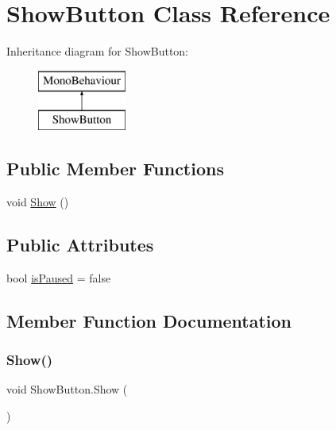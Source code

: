 \hypertarget{class_show_button}{}\section{Show\+Button Class Reference}
\label{class_show_button}
Inheritance diagram for Show\+Button\+:\begin{figure}[H]
\begin{center}
\leavevmode
\includegraphics[height=2.000000cm]{class_show_button}
\end{center}
\end{figure}
\subsection*{Public Member Functions}
\begin{DoxyCompactItemize}
\item 
void \mbox{\hyperlink{class_show_button_a8f2bd61ba16b46b401390a7357cf8249}{Show}} ()
\end{DoxyCompactItemize}
\subsection*{Public Attributes}
\begin{DoxyCompactItemize}
\item 
bool \mbox{\hyperlink{class_show_button_abda8b88daac10df3fe20c640360fcaab}{is\+Paused}} = false
\end{DoxyCompactItemize}


\subsection{Member Function Documentation}
\mbox{\label{class_show_button_a8f2bd61ba16b46b401390a7357cf8249}} 
\subsubsection{\texorpdfstring{Show()}{Show()}}
{\footnotesize\ttfamily void Show\+Button.\+Show (\begin{DoxyParamCaption}{ }\end{DoxyParamCaption})\hspace{0.3cm}{\ttfamily [inline]}}



